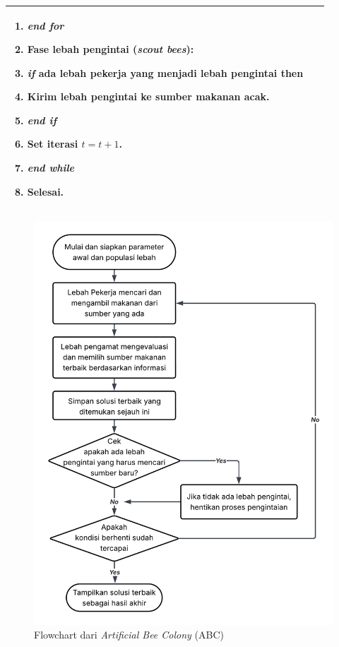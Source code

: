 \begin{table} [H]
\begin{tabular}{|p{0.95\linewidth}|}
\begin{enumerate}[leftmargin=*,label=\arabic*.,itemsep=0pt,parsep=0pt]
        \item \hspace{1em} \textbf{\textit{end for}}
        \item \hspace{1em} Fase lebah pengintai (\textit{scout bees}):
        \item \hspace{2em} \textbf{\textit{if}} ada lebah pekerja yang menjadi lebah pengintai \textbf{then}
        \item \hspace{3em} Kirim lebah pengintai ke sumber makanan acak.
        \item \hspace{2em} \textbf{\textit{end if}}
        \item \hspace{1em} Set iterasi $t = t + 1$.
        \item \textbf{\textit{end while}}
        \item Selesai.
    \end{enumerate} \\
    \hline
    \end{tabular}
\end{table}

\newpage

\begin{figure} [H] 
  \centering
  \includegraphics[width=0.85\linewidth]{gambar/Flowchart ABC Algorithm.png}
  \caption{Flowchart dari \textit{Artificial Bee Colony} (ABC)}
  \label{figure:Flowchart ABC Algorithm}
\end{figure}

